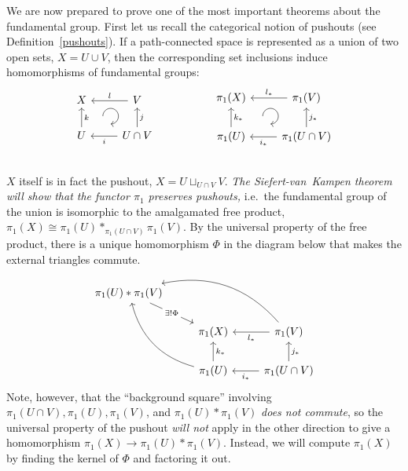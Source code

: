 We are now prepared to prove one of the most important theorems about the fundamental group. First let us recall the categorical notion of pushouts (see Definition~\ref{pushouts}). If a path-connected space is represented as a union of two open sets, $X=U\cup V$, then the corresponding set inclusions induce homomorphisms of fundamental groups:
\[
\begin{tikzcd}[every matrix/.append style={name=m},   
execute at end picture={\draw [<-] ([xshift=-8.5mm,yshift=1mm]m-2-2.north) arc[start angle=-90,delta angle=270,radius=0.25cm];}]
   X \arrow[r,leftarrow,"l"]\arrow[d,leftarrow,"k"]& V\arrow[d,leftarrow,"j"] \\
   U\arrow[r,,leftarrow,swap,"i"]& U\cap V\\
\end{tikzcd}
\quad\quad\quad\quad\quad
\begin{tikzcd}[every matrix/.append style={name=m},   
execute at end picture={\draw [<-] ([xshift=-11.5mm,yshift=1mm]m-2-2.north) arc[start angle=-90,delta angle=270,radius=0.25cm];}]
   \pi_1(X) \arrow[r,leftarrow,"l_\ast"]\arrow[d,leftarrow,"k_\ast"]& \pi_1(V)\arrow[d,leftarrow,"j_\ast"] \\
   \pi_1(U)\arrow[r,,leftarrow,swap,"i_\ast"]& \pi_1(U\cap V)\\
\end{tikzcd}
\]
$X$ itself is in fact the pushout, $X=U\sqcup_{U\cap V}V$. \emph{The Siefert-van~Kampen theorem will show that the functor $\pi_1$ preserves pushouts,} i.e.\ the fundamental group of the union is isomorphic to the amalgamated free product, $\pi_1(X)\cong \pi_1(U) \ast_{\pi_1(U\cap V)} \pi_1(V)$. By the universal property of the free product, there is a unique homomorphism $\Phi$ in the diagram below that makes the external triangles commute.
\[
\begin{tikzcd}
  \pi_1(U)\ast \pi_1(V)   \arrow[drr,leftarrow, bend left]   \arrow[ddr,leftarrow, bend right]   \arrow[dr,"\exists! \Phi" description] & & \\
    & \pi_1(X) \arrow[r,leftarrow,swap, "l_\ast"] \arrow[d,leftarrow, "k_\ast"]       & \pi_1(V) \arrow[d,leftarrow, "j_\ast"] \\ & \pi_1(U) \arrow[r,leftarrow,swap, "i_\ast"] &\pi_1(U\cap V) 
\end{tikzcd}
\]
Note, however, that the ``background square'' involving $\pi_1(U\cap V),\pi_1(U),\pi_1(V)$, and $\pi_1(U)\ast \pi_1(V)$ \emph{does not commute}, so the universal property of the pushout \emph{will not} apply in the other direction to give a homomorphism $\pi_1(X)\to \pi_1(U)\ast\pi_1(V)$. Instead, we will compute $\pi_1(X)$ by finding the kernel of $\Phi$ and factoring it out.

